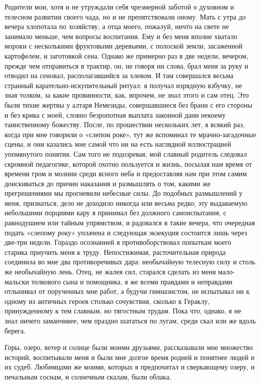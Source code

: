 Родители мои, хотя и не утруждали себя чрезмерной заботой о духовном и
телесном развитии  своего чада, но  и не препятствовали оному.  Мать с
утра до  вечера хлопотала по  хозяйству, а отца моего,  пожалуй, ничто
на  свете  не занимало  меньше,  чем  вопросы  воспитания. Ему  и  без
меня  вполне  хватало мороки  с  несколькими  фруктовыми деревьями,  с
полоской  земли,  засаженной  картофелем, и  заготовкой  сена.  Однако
же  примерно раз  в  две  недели, вечером,  прежде  чем отправиться  в
трактир,  он, не  говоря ни  слова,  брал меня  за руку  и отводил  на
сеновал, располагавшийся  за хлевом. И там  совершался весьма странный
карательно-искупительный ритуал:  я получал изрядную взбучку,  не зная
толком, за какие провинности, как, впрочем,  не знал этого и сам отец.
Это были тихие жертвы у алтаря Немезиды, совершавшиеся без брани с его
стороны и без  крика с моей, словно безропотная  выплата законной дани
некоему таинственному божеству. После, по прошествии нескольких лет, я
всякий раз, когда  при мне говорили о «слепом роке»,  тут же вспоминал
те мрачно-загадочные  сцены, и они казались  мне самой что ни  на есть
наглядной иллюстрацией  упомянутого понятия.  Сам того  не подозревая,
мой  славный родитель  следовал  скромной  педагогике, которой  охотно
пользуется и жизнь,  посылая нам время от времени гром  и молнии среди
ясного неба и  предоставляя нам при этом самим  доискиваться до причин
наказания и  размышлять о том,  какими же прегрешениями  мы прогневили
небесные силы.  До подобных  размышлений у  меня, признаться,  дело не
доходило никогда или весьма  редко; эту выдаваемую небольшими порциями
кару я принимал  без должного самоиспытания, с  равнодушием или тайным
упрямством, и радовался в такие  вечера, что очередная подать «слепому
року»  уплачена и  следующая  экзекуция состоится  лишь через  две-три
недели. Гораздо осознанней я  противоборствовал попыткам моего старика
приучить меня к труду.  Непостижимая, расточительная природа соединила
во мне два  противоречивых дара: необычайную телесную силу  и столь же
необычайную  лень.  Отец,  не  жалея сил,  старался  сделать  из  меня
мало-мальски  толкового  сына  и  помощника, я  же  всеми  правдами  и
неправдами отлынивал от порученных мне работ, а будучи гимназистом, не
испытывал ни к одному из античных героев столько сочувствия, сколько к
Гераклу, принужденному к  тем славным, но тягостным  трудам. Пока что,
однако, я  не знал ничего  заманчивее, чем праздно шататься  по лугам,
среди скал или же вдоль берега.

Горы,  озеро, ветер  и солнце  были моими  друзьями, рассказывали  мне
множество историй, воспитывали  меня и были мне долгое  время родней и
понятнее людей и их судеб. Любимцами же моими, которых я предпочитал и
сверкающему  озеру,  и  печальным  соснам, и  солнечным  скалам,  были
облака.

